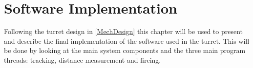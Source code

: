 \chapter{Software Implementation}\label{ImplLabel}
Following the turret design in \autoref{MechDesign} this chapter will be used to present and
describe the final implementation of the software used in the \name turret. This will be done
by looking at the main system components and the three main program threads:
tracking, distance measurement and fireing.


%






% 
